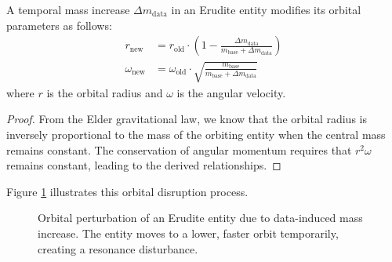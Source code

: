 \begin{theorem}
A temporal mass increase $\Delta m_{\text{data}}$ in an Erudite entity modifies its orbital parameters as follows:
\begin{align}
r_{\text{new}} &= r_{\text{old}} \cdot \left(1 - \frac{\Delta m_{\text{data}}}{m_{\text{base}} + \Delta m_{\text{data}}}\right) \\
\omega_{\text{new}} &= \omega_{\text{old}} \cdot \sqrt{\frac{m_{\text{base}}}{m_{\text{base}} + \Delta m_{\text{data}}}}
\end{align}
where $r$ is the orbital radius and $\omega$ is the angular velocity.
\end{theorem}

\begin{proof}
From the Elder gravitational law, we know that the orbital radius is inversely proportional to the mass of the orbiting entity when the central mass remains constant. The conservation of angular momentum requires that $r^2\omega$ remains constant, leading to the derived relationships.
\end{proof}

Figure \ref{fig:erudite_orbit_perturbation} illustrates this orbital disruption process.

\begin{figure}[h]
\centering
{}
\caption{Orbital perturbation of an Erudite entity due to data-induced mass increase. The entity moves to a lower, faster orbit temporarily, creating a resonance disturbance.}
\label{fig:erudite_orbit_perturbation}
\end{figure}

